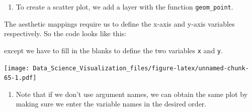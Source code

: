 \documentclass[
]{article}
\newenvironment{Shaded}{\begin{snugshade}}{\end{snugshade}}
\newcommand{\CommentTok}[1]{\textcolor[rgb]{0.56,0.35,0.01}{\textit{#1}}}
\newcommand{\DataTypeTok}[1]{\textcolor[rgb]{0.13,0.29,0.53}{#1}}
\newcommand{\KeywordTok}[1]{\textcolor[rgb]{0.13,0.29,0.53}{\textbf{#1}}}
\newcommand{\NormalTok}[1]{#1}
\newcommand{\OperatorTok}[1]{\textcolor[rgb]{0.81,0.36,0.00}{\textbf{#1}}}
\newcommand{\StringTok}[1]{\textcolor[rgb]{0.31,0.60,0.02}{#1}}
\providecommand{\tightlist}{%
  \setlength{\itemsep}{0pt}\setlength{\parskip}{0pt}}
\begin{document}
\begin{enumerate}
\def\labelenumi{\arabic{enumi}.}
\setcounter{enumi}{4}
\tightlist
\item
  To create a scatter plot, we add a layer with the function
  \texttt{geom\_point}.
\end{enumerate}

The aesthetic mappings require us to define the x-axis and y-axis
variables respectively. So the code looks like this:

\begin{Shaded}
\end{Shaded}

except we have to fill in the blanks to define the two variables
\texttt{x} and \texttt{y}.

\begin{Shaded}
\end{Shaded}

\texttt{[image: Data\_Science\_Visualization\_files/figure-latex/unnamed-chunk-65-1.pdf]}

\begin{enumerate}
\def\labelenumi{\arabic{enumi}.}
\setcounter{enumi}{5}
\tightlist
\item
  Note that if we don't use argument names, we can obtain the same plot
  by making sure we enter the variable names in the desired order.
\end{enumerate}

\begin{Shaded}
\end{Shaded}
\end{document}
